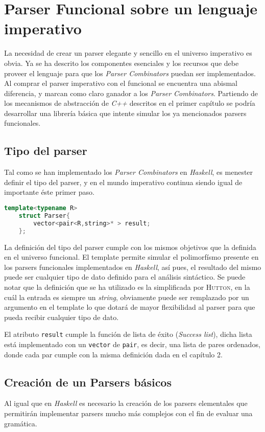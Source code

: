 \section{Parser Funcional sobre un lenguaje imperativo}

La necesidad de crear un parser elegante y sencillo en el universo imperativo es obvia. Ya se ha descrito los componentes esenciales y los recursos que debe proveer el lenguaje para que los \emph{Parser Combinators} puedan ser implementados. Al comprar el parser imperativo con el funcional se encuentra una abismal diferencia, y marcan como claro ganador a los  \emph{Parser Combinators}. Partiendo de los mecanismos de abstracción de \emph{C++} descritos en el primer capítulo se podría desarrollar una librería básica que intente simular los ya mencionados parsers funcionales.

	\subsection{Tipo del parser}
	Tal como se han implementado los \emph{Parser Combinators} en \emph{Haskell}, es menester definir el tipo del parser, y en el mundo imperativo continua siendo igual de importante éste primer paso.
	
	\begin{lstlisting}[language=C++, caption="Tipo Parser"]
	template<typename R>
	struct Parser{
		vector<pair<R,string>* > result;		
	};
	\end{lstlisting}

	La definición del tipo del parser cumple con los mismos objetivos que la definida en el universo funcional. El template permite simular el polimorfísmo presente en los parsers funcionales implementados en \emph{Haskell}, así pues, el resultado del mismo puede ser cualquier tipo de dato definido para el análisis sintáctico. 
	Se puede notar que la definición que se ha utilizado es la simplificada por \textsc{Hutton}, en la cuál la entrada es siempre un \emph{string}, obviamente puede ser remplazado por un argumento en el template lo que dotará de mayor flexibilidad al parser para que pueda recibir cualquier tipo de dato.
	
	El atributo \texttt{result} cumple la función de lista de éxito (\emph{Success list}), dicha lista está implementado con un \texttt{vector} de \texttt{pair}, es decir, una lista de pares ordenados, donde cada par cumple con la misma definición dada en el capítulo 2.
	
	\subsection{Creación de un Parsers básicos}
	Al igual que en \emph{Haskell} es necesario la creación de los parsers elementales que permitirán implementar parsers mucho más complejos con el fin de evaluar una gramática.
	
